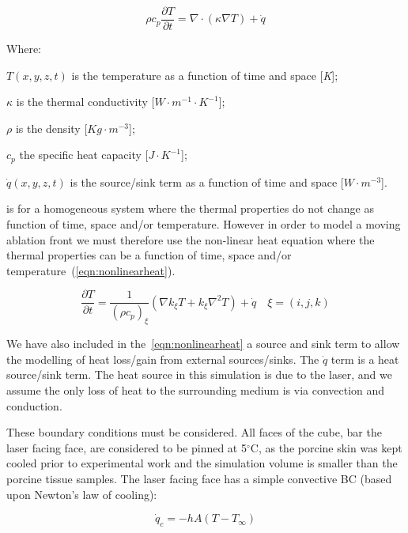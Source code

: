 \begin{equation}
\rho c_p \frac{\partial T}{\partial t}= \nabla \cdot (\kappa \nabla T) + \dot{q}
\label{eqn:heat}
\end{equation}

\noindent Where:

	\indent $T(x, y, z, t)$ is the temperature as a function of time and space [\textit{K}];
	
	\indent $\kappa$ is the thermal conductivity [$W\cdot m^{-1}\cdot K^{-1}$];
	
	\indent $\rho$ is the density [$Kg \cdot m^{-3}$];
	
	\indent $c_p$ the specific heat capacity [$J\cdot K^{-1}$];
	
	\indent $\dot{q}(x,y,z,t)$ is the source/sink term as a function of time and space [$W\cdot m^{-3}$].
	
	\medskip

 is for a homogeneous system where the thermal properties do not change as function of time, space and/or temperature. However in order to model a moving ablation front we must therefore use the non-linear heat equation where the thermal properties can be a function of time, space and/or temperature~(\cref{eqn:nonlinearheat}).

\begin{equation}
\frac{\partial T}{\partial t} = \frac{1}{(\rho c_p)_{\xi}}(\nabla k_\xi T + k_\xi\nabla^2T)+\dot{q}\quad \xi=(i,j,k)
\label{eqn:nonlinearheat}
\end{equation}

We have also included in the~\cref{eqn:nonlinearheat} a source and sink term to allow the modelling of heat loss/gain from external sources/sinks. The $\dot{q}$ term is a heat source/sink term. The heat source in this simulation is due to the laser, and we assume the only loss of heat to the surrounding medium is via convection and conduction.
	
These boundary conditions must be considered. All faces of the cube, bar the laser facing face, are considered to be pinned at 5$^{\circ}$C, as the porcine skin was kept cooled prior to experimental work and the simulation volume is smaller than the porcine tissue samples. The laser facing face has a simple convective BC (based upon Newton’s law of cooling):	

\begin{equation}
\dot{q}_c = -hA(T - T_\infty)
\label{eqn:bceqns}
\end{equation}


